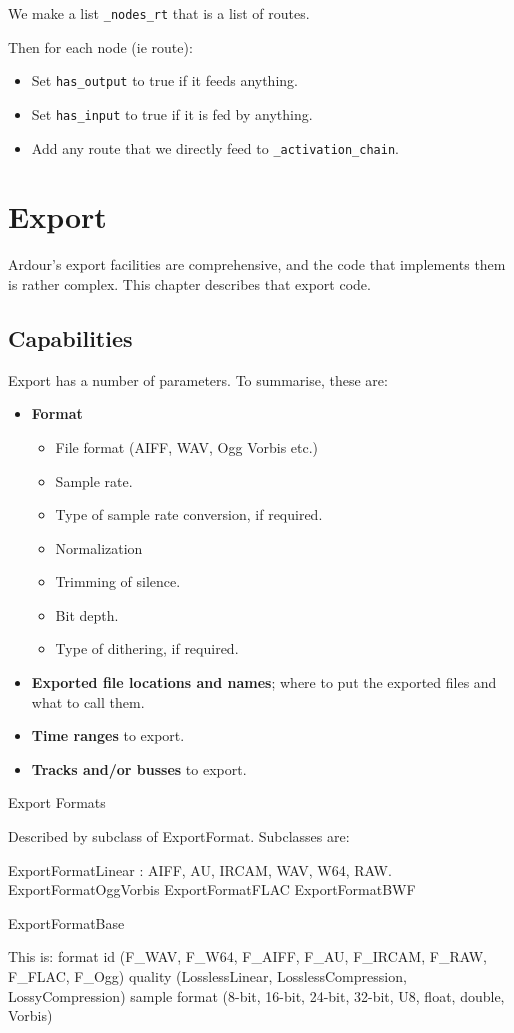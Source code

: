 \documentclass[10pt,a4paper]{book}
\newcommand{\code}[1]{\texttt{#1}}
\begin{document}
We make a list \code{\_nodes\_rt} that is a list of routes.

Then for each node (ie route):

\begin{itemize}
\item Set \code{has\_output} to true if it feeds anything.
\item Set \code{has\_input} to true if it is fed by anything.
\item Add any route that we directly feed to \code{\_activation\_chain}.
\end{itemize}

\chapter{Export}

Ardour's export facilities are comprehensive, and the code that
implements them is rather complex.  This chapter describes that export code.

\section{Capabilities}

Export has a number of parameters.  To summarise, these are:

\begin{itemize}
\item \textbf{Format}
  \begin{itemize}
  \item File format (AIFF, WAV, Ogg Vorbis etc.)
  \item Sample rate.
  \item Type of sample rate conversion, if required.
  \item Normalization
  \item Trimming of silence.
  \item Bit depth.
  \item Type of dithering, if required.
  \end{itemize}
\item \textbf{Exported file locations and names}; where to put the exported files and what to call them.
\item \textbf{Time ranges} to export.
\item \textbf{Tracks and/or busses} to export.
\end{itemize}



Export Formats

Described by subclass of ExportFormat.  Subclasses are:

ExportFormatLinear : AIFF, AU, IRCAM, WAV, W64, RAW.
ExportFormatOggVorbis
ExportFormatFLAC
ExportFormatBWF

ExportFormatBase 

This is:
 format id (F\_WAV, F\_W64, F\_AIFF, F\_AU, F\_IRCAM, F\_RAW, F\_FLAC, F\_Ogg)
 quality (LosslessLinear, LosslessCompression, LossyCompression)
 sample format (8-bit, 16-bit, 24-bit, 32-bit, U8, float, double, Vorbis)
\end{document}
